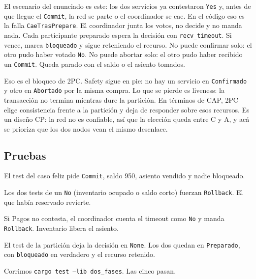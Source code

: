 El escenario del enunciado es este: los dos servicios ya contestaron
\texttt{Yes} y, antes de que llegue el \texttt{Commit}, la red se parte o
el coordinador se cae. En el código eso es la falla
\texttt{CaeTrasPrepare}. El coordinador junta los votos, no decide y no
manda nada. Cada participante preparado espera la decisión con
\texttt{recv\_timeout}. Si vence, marca \texttt{bloqueado} y sigue
reteniendo el recurso. No puede confirmar solo: el otro pudo haber votado
\texttt{No}. No puede abortar solo: el otro pudo haber recibido un
\texttt{Commit}. Queda parado con el saldo o el asiento tomados.

Eso es el bloqueo de 2PC. Safety sigue en pie: no hay un servicio en
\texttt{Confirmado} y otro en \texttt{Abortado} por la misma compra. Lo
que se pierde es liveness: la transacción no termina mientras dure la
partición. En términos de CAP, 2PC elige consistencia frente a la
partición y deja de responder sobre esos recursos. Es un diseño CP: la
red no es confiable, así que la elección queda entre C y A, y acá se
prioriza que los dos nodos vean el mismo desenlace.

\subsection{Pruebas}

El test del caso feliz pide \texttt{Commit}, saldo 950, asiento vendido y
nadie bloqueado.

Los dos tests de un \texttt{No} (inventario ocupado o saldo corto) fuerzan
\texttt{Rollback}. El que había reservado revierte.

Si Pagos no contesta, el coordinador cuenta el timeout como \texttt{No} y
manda \texttt{Rollback}. Inventario libera el asiento.

El test de la partición deja la decisión en \texttt{None}. Los dos quedan
en \texttt{Preparado}, con \texttt{bloqueado} en verdadero y el recurso
retenido.

Corrimos \texttt{cargo test --lib dos\_fases}. Las cinco pasan.
